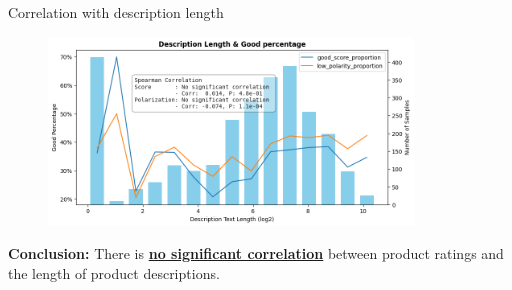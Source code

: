 \begin{frame}{Correlation with description length}

	\begin{figure}
		\centering
			\includegraphics[height=5cm]{pic/corr_len_text.png}
	\end{figure}

    \textbf{Conclusion:} There is \underline{\textbf{no significant correlation}} between product ratings and the length of product descriptions.

\end{frame}


